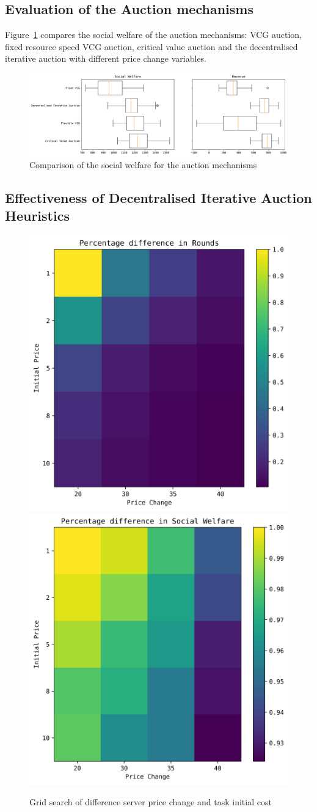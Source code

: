 \subsection{Evaluation of the Auction mechanisms}\label{subsec:evaluation-of-the-auction-mechanisms}
Figure~\ref{fig:auction-mechanisms-comparison} compares the social welfare of the auction mechanisms: VCG auction,
fixed resource speed VCG auction, critical value auction and the decentralised iterative auction with different price
change variables.

\begin{figure}[h]
    \centering
    \includegraphics[width=\linewidth]{figs/auctions/auctions_results.png}
    \caption{Comparison of the social welfare for the auction mechanisms}
    \label{fig:auction-mechanisms-comparison}
\end{figure}

\subsection{Effectiveness of Decentralised Iterative Auction Heuristics}
\label{subsec:effectiveness-of-decentralised-iterative-auction-heuristics}
\begin{figure}[h]
    \centering
    \includegraphics[width=0.45\linewidth]{figs/dia_heuristics/rounds_grid.png}
    \includegraphics[width=0.45\linewidth]{figs/dia_heuristics/social_welfare_grid.png}
    \caption{Grid search of difference server price change and task initial cost}
    \label{fig:dia_sw_rev_grid_search}
\end{figure}

